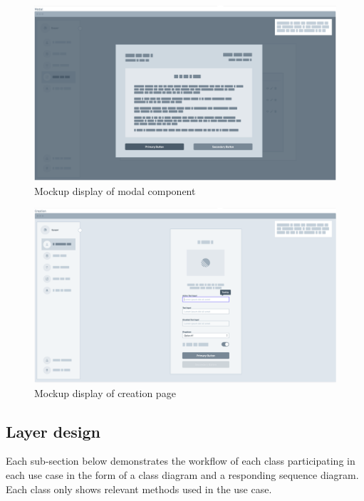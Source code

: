 \documentclass[../Main.tex]{subfiles}
\begin{document}
\begin{figure}[H]
    \centering
    \includegraphics[scale=0.35]{doc/thesis/EN/imgs/mockup3.png}
    \caption{Mockup display of modal component}
    \label{fig:Mockup3}
\end{figure}
\begin{figure}[H]
    \centering
    \includegraphics[scale=0.35]{doc/thesis/EN/imgs/mockup4.png}
    \caption{Mockup display of creation page}
    \label{fig:Mockup4}
\end{figure}

\subsection{Layer design}
Each sub-section below demonstrates the workflow of each class participating in each use case in the form of a class diagram and a responding sequence diagram. Each class only shows relevant methods used in the use case.
\end{document}
